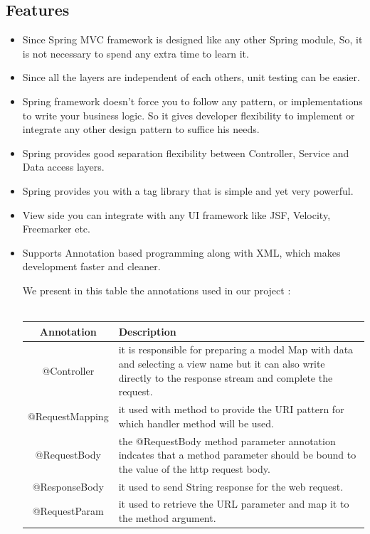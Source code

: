 \documentclass[12pt]{article}
\begin{document}
\subsection{Features}
\begin{itemize}
	\item Since Spring MVC framework is designed like any other Spring module, So, it is not necessary to spend any extra time to learn it.
	\item Since all the layers are independent of each others, unit testing can be easier.
	\item Spring framework doesn’t force you to follow any pattern, or implementations to write your business logic. So it gives developer flexibility to implement or integrate any other design pattern to suffice his needs.
	\item Spring provides good separation flexibility between Controller, Service and Data access layers.
	\item Spring provides you with a tag library that is simple and yet very powerful.
	\item View side you can integrate with any UI framework like JSF, Velocity, Freemarker etc.
	\item Supports Annotation based programming along with XML, which makes development faster and cleaner.
	
	We present in this table the annotations used in our project :
	\\
	\\
		\begin{table}
		\centering
		\begin{tabular}{|c|p{10cm}|}
		\hline
		\textbf{Annotation} & \textbf{Description }\\
		\hline
		@Controller & it is responsible for preparing a model Map with data and selecting a view name but it can also write directly to the response stream and complete the request.  \\
		@RequestMapping & it used with method to provide the URI pattern for which handler method will be used.\\
		@RequestBody & the @RequestBody method parameter annotation indcates that a method parameter should be bound to the value of the http request body.  \\
		@ResponseBody & it used to send String response for the web request.  \\	
	    @RequestParam & it used to retrieve the URL parameter and map it to the method argument. \\
		\hline
	\end{tabular}
	\end{table}

\end{itemize}
\newpage
\end{document}
